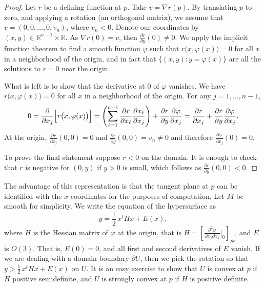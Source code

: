 \documentclass[12pt,openany]{book}
\newcommand{\R}{{\mathbb{R}}}
\theoremstyle{plain}
\theoremstyle{remark}
\theoremstyle{definition}
\theoremstyle{exercise}
\theoremstyle{example}
\begin{document}
\begin{proof}
Let $r$ be a defining function at $p$.  Take $v = \nabla r (p)$.
By translating $p$ to zero, and applying a rotation (an orthogonal matrix),
we assume that $v = (0,0,\ldots,0,v_n)$, where $v_n < 0$.  Denote our
coordinates by $(x,y) \in \R^{n-1} \times \R$.  As $\nabla r(0) =
v$, then $\frac{\partial r}{\partial y}(0) \not= 0$.  We apply 
the implicit function theorem to find a
smooth %
function $\varphi$ such that
$r\bigl(x,\varphi(x)\bigr) = 0$ for all $x$ in a neighborhood of the
origin, and in fact that $\{ (x,y) : y=\varphi(x) \}$ are all the
solutions to $r = 0$ near the origin.

What is left is to show that the derivative at 0 of $\varphi$ vanishes.
We have
$r\bigl(x,\varphi(x)\bigr) = 0$ for all $x$ in a neighborhood of the
origin.
For any $j=1,\ldots,n-1$,
\begin{equation*}
0 = 
\frac{\partial}{\partial x_j} \Bigl[
r\bigl(x,\varphi(x)\bigr) 
\Bigr]
=
\left(
\sum_{\ell=1}^{n-1}
\frac{\partial r}{\partial x_\ell}
\frac{\partial x_\ell}{\partial x_j}
\right)
+
\frac{\partial r}{\partial y}
\frac{\partial \varphi}{\partial x_j}
=
\frac{\partial r}{\partial x_j}
+
\frac{\partial r}{\partial y}
\frac{\partial \varphi}{\partial x_j} .
\end{equation*}
At the origin,
$\frac{\partial r}{\partial x_j}(0,0) = 0$ and
$\frac{\partial r}{\partial y}(0,0) = v_n \not= 0$ and therefore
$\frac{\partial \varphi}{\partial x_j}(0) = 0$.

To prove the final statement suppose
$r < 0$ on the domain.  It is enough to check that $r$ is
negative for $(0,y)$ if $y > 0$ is small, which follows as $\frac{\partial
r}{\partial y}(0,0) < 0$.
\end{proof}

The advantage of this representation is that the tangent plane at $p$
can be identified with the $x$ coordinates for the purposes of computation.
Let $M$ be smooth for simplicity.
We write the equation of the hypersurface as
\begin{equation*}
y = \frac{1}{2}\, x^t H x + E(x) ,
\end{equation*}
where $H$ is the Hessian matrix of $\varphi$ at the origin, that is $H = \left[
\frac{\partial^2 \varphi}{\partial x_j \partial x_k} \big|_{0} \right]_{jk}$,
and $E$ is $O(3)$.  That is, $E(0) = 0$, and
all first and second derivatives of $E$ vanish.  If we are dealing with a domain boundary
$\partial U$, then
we pick the rotation so that $y > \frac{1}{2}\,x^t H x + E(x)$ on $U$.
It is an easy exercise to show that $U$ is convex at $p$ if
$H$ positive semidefinite, and $U$ is strongly convex at $p$ if $H$ is positive definite.
\end{document}
